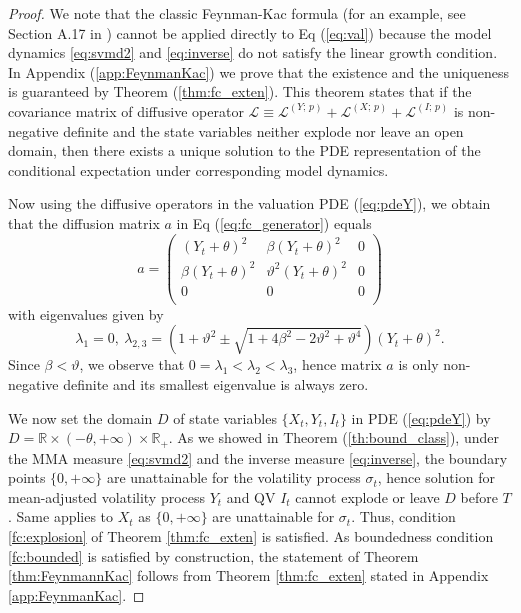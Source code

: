 \documentclass[pdftex,11pt,a4paper] {article}
\begin{document}
\begin{proof}
We note that the classic Feynman-Kac formula (for an example, see Section A.17 in \cite{Musiela2009}) cannot be applied directly to Eq (\ref{eq:val}) because the model dynamics \eqref{eq:svmd2} and \eqref{eq:inverse} do not satisfy the linear growth condition. In Appendix (\ref{app:FeynmanKac}) we prove that the existence and the uniqueness is guaranteed by Theorem (\ref{thm:fc_exten}). This theorem states that if the covariance matrix of diffusive operator $\mathcal{L} \equiv \mathcal{L}^{(Y;\,p)} + \mathcal{L}^{(X;\,p)} + \mathcal{L}^{(I;\,p)}$ is non-negative definite and the state variables neither explode nor leave an open domain, then there exists a unique solution to the PDE representation of the conditional expectation under corresponding model dynamics.

Now using the diffusive operators in the valuation PDE (\ref{eq:pdeY}), we obtain that the diffusion matrix $a$ in Eq (\ref{eq:fc_generator}) equals
\begin{equation}
a=
\begin{pmatrix} 
(Y_t+\theta)^2 & \beta(Y_t+\theta)^2 & 0\\ 
\beta(Y_t+\theta)^2 & \vartheta^2(Y_t+\theta)^2 & 0\\ 
0 & 0 & 0\\ 
\end{pmatrix}
\end{equation}
with eigenvalues given by
\begin{equation*}
\lambda_1=0, \ \lambda_{2,3}=\left(1+\vartheta^2\pm\sqrt{1+4\beta^2-2\vartheta^2+\vartheta^4}\right)(Y_t+\theta)^2.
\end{equation*}
Since $\beta<\vartheta$, we observe that $0=\lambda_1<\lambda_2<\lambda_3$, hence matrix $a$ is only non-negative definite and its smallest eigenvalue is always zero. 

We now set the domain $D$ of state variables $\{X_t, Y_t, I_t\}$ in PDE (\ref{eq:pdeY}) by $D=\mathbb{R}\times (-\theta, +\infty)\times \mathbb{R}_+$. 
As we showed in Theorem (\ref{th:bound_class}), under the MMA measure \eqref{eq:svmd2} and the inverse measure \eqref{eq:inverse}, the boundary points $\{0, +\infty\}$ are unattainable for the volatility process $\sigma_t$, hence solution for mean-adjusted volatility process $Y_t$ and QV $I_t$ cannot explode or leave $D$ before $T$. Same applies to $X_t$ as $\{0, +\infty\}$ are unattainable for $\sigma_t$.  Thus, condition \ref{fc:explosion} of Theorem \ref{thm:fc_exten} is satisfied. 
As boundedness condition \ref{fc:bounded}  is satisfied by construction, the statement of Theorem \ref{thm:FeynmannKac} follows from Theorem \ref{thm:fc_exten} stated in Appendix \ref{app:FeynmanKac}.

\end{proof}
\end{document}
